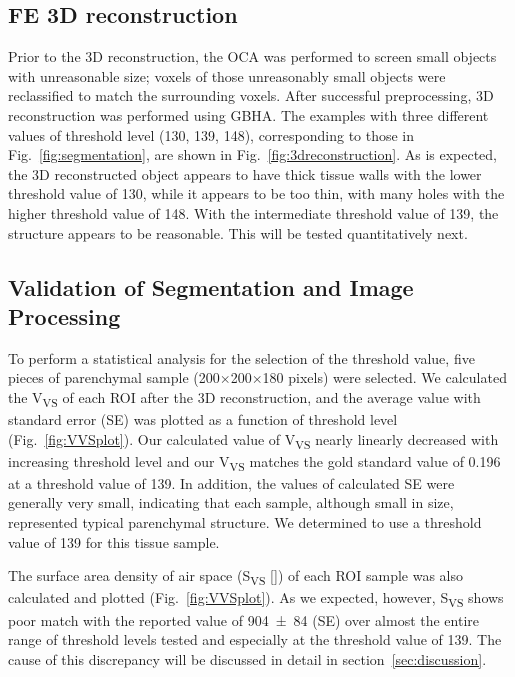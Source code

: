 \subsection{FE 3D reconstruction}
Prior to the 3D reconstruction, the OCA was performed to screen small objects with unreasonable size; voxels of those unreasonably small objects were reclassified to match the surrounding voxels. After successful preprocessing, 3D reconstruction was performed using GBHA. The examples with three different values of threshold level (130, 139, 148), corresponding to those in Fig.~\ref{fig:segmentation}, are shown in Fig.~\ref{fig:3dreconstruction}. As is expected, the 3D reconstructed object appears to have thick tissue walls with the lower threshold value of 130, while it appears to be too thin, with many holes with the higher threshold value of 148. With the intermediate threshold value of 139, the structure appears to be reasonable. This will be tested quantitatively next.

\subsection{Validation of Segmentation and Image Processing}
To perform a statistical analysis for the selection of the threshold value, five pieces of parenchymal sample (200$\times$200$\times$180 pixels) were selected. We calculated the V\textsubscript{VS} of each ROI after the 3D reconstruction, and the average value with standard error (SE) was plotted as a function of threshold level (Fig.~\ref{fig:VVSplot}). Our calculated value of V\textsubscript{VS} nearly linearly decreased with increasing threshold level and our V\textsubscript{VS} matches the gold standard value of 0.196 at a threshold value of 139. In addition, the values of calculated SE were generally very small, indicating that each sample, although small in size, represented typical parenchymal structure. We determined to use a threshold value of 139 for this tissue sample.

The surface area density of air space (S\textsubscript{VS} [\centimetresquared\per\centimetrecubed]) of each ROI sample was also calculated and plotted (Fig.~\ref{fig:VVSplot}). As we expected, however, S\textsubscript{VS} shows poor match with the reported value of \num[seperr]{904(84)} (SE) over almost the entire range of threshold levels tested and especially at the threshold value of 139. The cause of this discrepancy will be discussed in detail in section~\ref{sec:discussion}.

